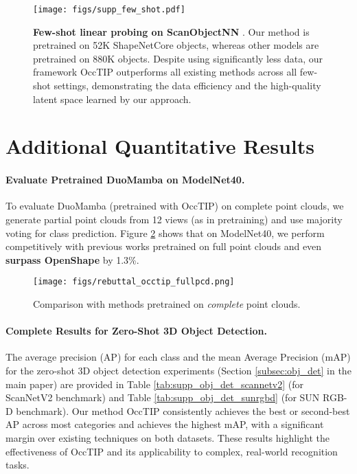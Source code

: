 \begin{figure}[!h]
    \centering
    \texttt{[image: figs/supp\_few\_shot.pdf]}
    \caption{\textbf{Few-shot linear probing on ScanObjectNN} \cite{scanobjectnn}. Our method is pretrained on 52K ShapeNetCore \cite{shapenet} objects, whereas other models are pretrained on 880K objects. Despite using significantly less data, our framework OccTIP outperforms all existing methods across all few-shot settings, demonstrating the data efficiency and the high-quality latent space learned by our approach.
    }    
    \label{fig:supp_fewshot_comparison}
\vspace{-1mm}
\end{figure}
\vspace{-1cm}
\section{Additional Quantitative Results}
\paragraph{Evaluate Pretrained DuoMamba on ModelNet40.} To evaluate {DuoMamba (pretrained with OccTIP) on complete point clouds,} we generate partial point clouds from 12 views (as in pretraining) and use majority voting for class prediction. Figure \ref{fig:duomamba_modelnet40} shows that on ModelNet40, we perform competitively with previous works pretrained on full point clouds and even \textbf{surpass OpenShape} by 1.3\%. 
\begin{figure}[!h]
    \centering
    \texttt{[image: figs/rebuttal\_occtip\_fullpcd.png]}
    \caption{Comparison with methods pretrained on \textit{complete} point clouds.}    
    \label{fig:duomamba_modelnet40}
\vspace{-1mm}
\end{figure}

\paragraph{Complete Results for Zero-Shot 3D Object Detection.}
\label{sec:supp_complete_obj_det}
The average precision (AP) for each class and the mean Average Precision (mAP) for the zero-shot 3D object detection experiments (Section \ref{subsec:obj_det} in the main paper) are provided in Table \ref{tab:supp_obj_det_scannetv2} (for ScanNetV2 \cite{scannetv2} benchmark) and Table \ref{tab:supp_obj_det_sunrgbd} (for SUN RGB-D \cite{sunrgbd} benchmark). 
Our method OccTIP consistently achieves the best or second-best AP across most categories and achieves the highest mAP, with a significant margin over existing techniques on both datasets. These results highlight the effectiveness of OccTIP and its applicability to complex, real-world recognition tasks.

